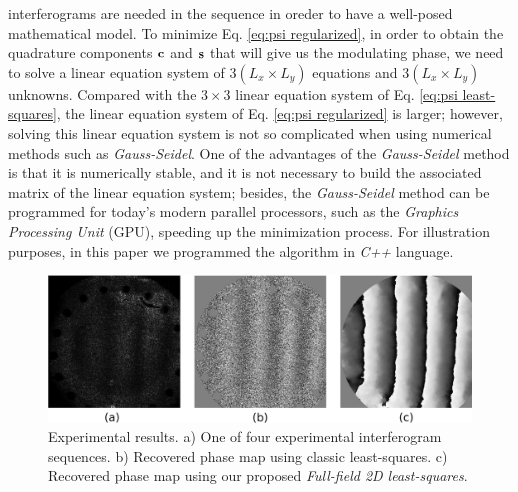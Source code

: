 interferograms are needed in the sequence in oreder to have a well-posed
mathematical model. To minimize Eq. \eqref{eq:psi regularized}, in
order to obtain the quadrature components $\bf c$ and $\bf s$ that
will give us the modulating phase, we need to solve a linear equation
system of $3(L_x\times L_y)$ equations and $3(L_x\times L_y)$
unknowns. Compared with the $3\times 3$ linear equation system of
Eq. \eqref{eq:psi least-squares}, the linear equation system of
Eq. \eqref{eq:psi regularized} is larger; however, solving this
linear equation system is not so complicated when using numerical
methods such as \emph{Gauss-Seidel}. One of the advantages of
the \emph{Gauss-Seidel} method is that it is numerically stable, and
it is not necessary to build the associated matrix of the linear
equation system; besides, the \emph{Gauss-Seidel} method can be
programmed for today's modern parallel processors, such as the
\emph{Graphics Processing Unit} (GPU), speeding up the minimization
process. For illustration purposes, in this paper we programmed the algorithm in
\emph{C++} language.
\begin{figure}[th!]
	\begin{center}
		\includegraphics[scale=0.25]{Chpt1_figures/Fig_2.eps}
	\end{center}
	\caption{Experimental results. a) One of four experimental 
	interferogram sequences. b) Recovered phase map using classic 
	least-squares. c) Recovered phase map using our proposed 
	\textit{Full-field 2D least-squares}.}
	\label{fig:ExpPhaseComparison}
\end{figure}

